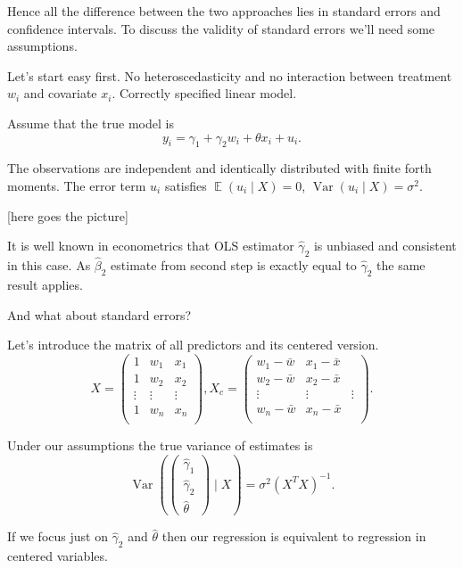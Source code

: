\documentclass[10pt, a4paper]{article}
\DeclareMathOperator{\Var}{Var}
\DeclareMathOperator{\E}{\mathbb{E}}
\begin{document}
Hence all the difference between the two approaches lies in standard errors and confidence intervals.
To discuss the validity of standard errors we'll need some assumptions.


Let's start easy first. No heteroscedasticity and no interaction between treatment $w_i$ and covariate $x_i$.
Correctly specified linear model. 

Assume that the true model is 
\[
y_i = \gamma_1 + \gamma_2 w_i + \theta x_i + u_i.
\]

The observations are independent and identically distributed with finite forth moments. 
The error term $u_i$ satisfies $\E(u_i \mid X) = 0$, $\Var(u_i \mid X) = \sigma^2$.

[here goes the picture]


It is well known in econometrics that OLS estimator $\hat\gamma_2$ is unbiased and consistent in this case.
As $\hat\beta_2$ estimate from second step is exactly equal to $\hat\gamma_2$ the same result applies.

And what about standard errors?


Let's introduce the matrix of all predictors and its centered version.
\[
X = \begin{pmatrix}
    1 & w_1 & x_1 \\
    1 & w_2 & x_2 \\
    \vdots & \vdots & \vdots \\
    1 & w_n & x_n \\
\end{pmatrix},
X_c = \begin{pmatrix}
    w_1 - \bar w & x_1 - \bar x \\
    w_2 - \bar w & x_2 - \bar x\\
    \vdots & \vdots & \vdots \\
    w_n - \bar w& x_n  - \bar x \\
\end{pmatrix}.    
\]


Under our assumptions the true variance of estimates is
\[
\Var\left( 
\begin{pmatrix}    
    \hat \gamma_1 \\
    \hat \gamma_2 \\
    \hat \theta
\end{pmatrix}
\mid X \right) = \sigma^2 (X^TX)^{-1}.
\]

If we focus just on $\hat\gamma_2$ and $\hat\theta$ then 
our regression is equivalent to regression in centered variables.
\end{document}
